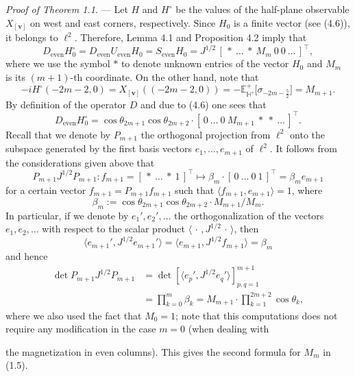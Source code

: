 \documentclass[11pt]{article}
\newcommand{\Dev}{D_{\mathrm{even}}}
\newcommand{\Uev}{U_{\mathrm{even}}}
\newcommand{\Sev}{S_{\mathrm{even}}}
\newcommand{\bHd}{\mathbb{H}^{\diamond}}
\newcommand{\bvv}{\mathbf{v}}
\begin{document}
\medskip
\noindent\emph{Proof of Theorem 1.1.} --- Let $H$ and $H^{\circ}$ be the
values of the half-plane observable $X_{[\bvv]}$ on west and east corners,
respectively. Since $H_0$ is a finite vector (see (4.6)), it belongs to
$\ell^2$. Therefore, Lemma 4.1 and Proposition 4.2 imply that
\[
\Dev H_0^{\circ} = \Dev\Uev H_0 = \Sev H_0
= J^{1/2}\,[\,*\ \dots\ *\ M_m\ 0\ 0\ \dots\,]^{\top},
\]
where we use the symbol $*$ to denote unknown entries of the vector $H_0$ and
$M_m$ is its $(m+1)$-th coordinate. On the other hand, note that
\[
-iH^{\circ}(-2m-2,0) = X_{[\bvv]}((-2m-2,0))
= -\mathbb{E}^{+}_{\bHd}\bigl[\sigma_{-2m-\frac52}\bigr] = M_{m+1}.
\]
By definition of the operator $D$ and due to (4.6) one sees that
\[
\Dev H_0^{\circ} = \cos\theta_{2m+1}\cos\theta_{2m+2}
\cdot[\,0\ \dots\ 0\ M_{m+1}\ *\ *\ \dots\,]^{\top}.
\]
Recall that we denote by $P_{m+1}$ the orthogonal projection from $\ell^2$
onto the subspace generated by the first basis vectors $e_1,\dots,e_{m+1}$ of
$\ell^2$. It follows from the considerations given above that
\[
P_{m+1}J^{1/2}P_{m+1} : f_{m+1} = [\,*\ \dots\ *\ 1\,]^{\top}
\mapsto \beta_m\cdot[\,0\ \dots\ 0\ 1\,]^{\top} = \beta_m e_{m+1}
\]
for a certain vector $f_{m+1} = P_{m+1}f_{m+1}$ such that
$\langle f_{m+1}, e_{m+1}\rangle = 1$, where
\[
\beta_m := \cos\theta_{2m+1}\cos\theta_{2m+2}\cdot M_{m+1}/M_m.
\]
In particular, if we denote by $e_1',e_2',\dots$ the orthogonalization of
the vectors $e_1,e_2,\dots$ with respect to the scalar product
$\langle\,\cdot\,,J^{1/2}\,\cdot\,\rangle$, then
\[
\langle e_{m+1}',J^{1/2}e_{m+1}'\rangle
= \langle e_{m+1},J^{1/2}f_{m+1}\rangle = \beta_m
\]
and hence
\begin{align*}
\det P_{m+1}J^{1/2}P_{m+1}
&= \det[\langle e_p',J^{1/2}e_q'\rangle]_{p,q=1}^{m+1}\\
&= \prod_{k=0}^{m}\beta_k = M_{m+1}\cdot\prod_{k=1}^{2m+2}\cos\theta_k,
\end{align*}
where we also used the fact that $M_0 = 1$; note that this computations does
not require any modification in the case $m = 0$ (when dealing with

the magnetization in even columns). This gives the second formula for $M_m$
in (1.5).
\end{document}
